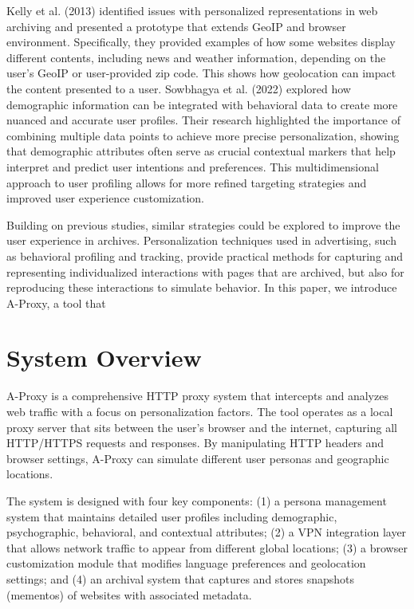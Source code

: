 \documentclass[sigconf]{acmart}
\begin{document}
Kelly et al. (2013) \cite{kelly2013method} identified issues with personalized representations in web archiving and presented a prototype that extends GeoIP and browser environment. Specifically, they provided examples of how some websites display different contents, including news and weather information, depending on the user’s GeoIP or user-provided zip code. This shows how geolocation can impact the content presented to a user. Sowbhagya et al. (2022) \cite{hidri2024learning} explored how demographic information can be integrated with behavioral data to create more nuanced and accurate user profiles. Their research highlighted the importance of combining multiple data points to achieve more precise personalization, showing that demographic attributes often serve as crucial contextual markers that help interpret and predict user intentions and preferences. This multidimensional approach to user profiling allows for more refined targeting strategies and improved user experience customization.

Building on previous studies, similar strategies could be explored to improve the user experience in archives. Personalization techniques used in advertising, such as behavioral profiling and tracking, provide practical methods for capturing and representing individualized interactions with pages that are archived, but also for reproducing these interactions to simulate behavior. In this paper, we introduce A-Proxy, a tool that 



\section{System Overview}
A-Proxy is a comprehensive HTTP proxy system that intercepts and analyzes web traffic with a focus on personalization factors. The tool operates as a local proxy server that sits between the user's browser and the internet, capturing all HTTP/HTTPS requests and responses. By manipulating HTTP headers and browser settings, A-Proxy can simulate different user personas and geographic locations.

The system is designed with four key components: (1) a persona management system that maintains detailed user profiles including demographic, psychographic, behavioral, and contextual attributes; (2) a VPN integration layer that allows network traffic to appear from different global locations; (3) a browser customization module that modifies language preferences and geolocation settings; and (4) an archival system that captures and stores snapshots (mementos) of websites with associated metadata.
\end{document}

